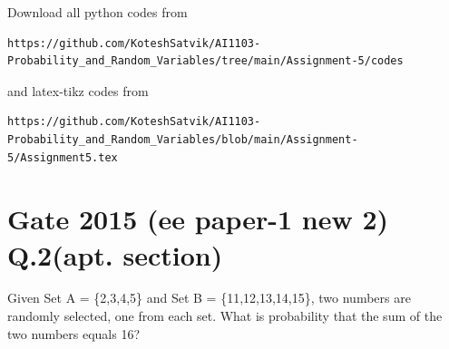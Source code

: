\documentclass[journal,12pt,twocolumn]{IEEEtran}
\begin{document}
\author{Songa Kotesh Satvik}
\maketitle
\newpage
\bigskip
\renewcommand{\thefigure}{\theenumi}
\renewcommand{\thetable}{\theenumi}
Download all python codes from 
\begin{lstlisting}
https://github.com/KoteshSatvik/AI1103-Probability_and_Random_Variables/tree/main/Assignment-5/codes
\end{lstlisting}
%
and latex-tikz codes from 
%
\begin{lstlisting}
https://github.com/KoteshSatvik/AI1103-Probability_and_Random_Variables/blob/main/Assignment-5/Assignment5.tex
\end{lstlisting}
\section{\textbf{Gate 2015 (ee paper-1 new 2) Q.2(apt. section)}}
Given Set A = \{2,3,4,5\} and Set B = \{11,12,13,14,15\}, two numbers are randomly selected, one from each set. What is probability that the sum of the two numbers equals 16?
\end{document}
